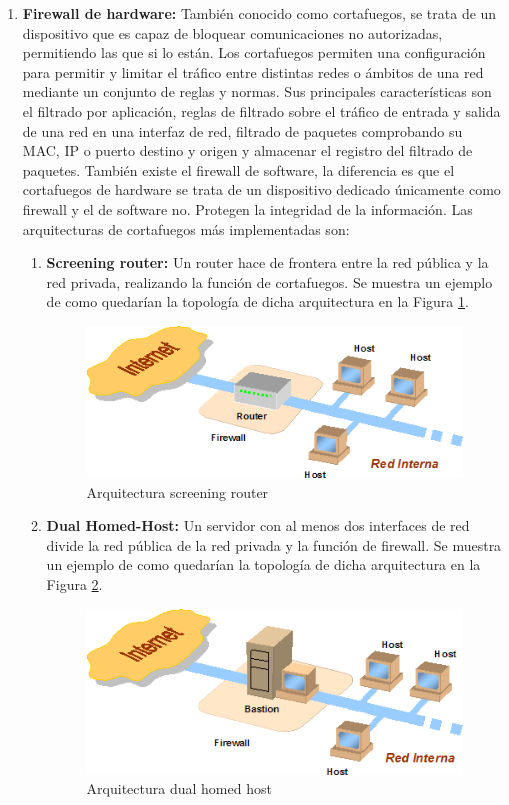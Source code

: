 \begin{enumerate}
\item {\bfseries Firewall de hardware:}
También conocido como cortafuegos, se trata de un dispositivo que es capaz de bloquear comunicaciones no autorizadas, permitiendo las que si lo están. Los cortafuegos permiten una configuración para permitir y limitar el tráfico entre distintas redes o ámbitos de una red mediante un conjunto de reglas y normas. Sus principales características son el filtrado por aplicación, reglas de filtrado sobre el tráfico de entrada y salida de una red en una interfaz de red, filtrado de paquetes comprobando su MAC, IP o puerto destino y origen y almacenar el registro del filtrado de paquetes. También existe el firewall de software, la diferencia es que el cortafuegos de hardware se trata de un dispositivo dedicado únicamente como firewall y el de software no. Protegen la integridad de la información.  Las arquitecturas de cortafuegos más implementadas son:
\begin{enumerate}
\item {\bfseries Screening router:}
 Un router hace de frontera entre la red pública y la red privada, realizando la función de cortafuegos. Se muestra un ejemplo de como quedarían la topología de dicha arquitectura en la Figura \ref{img:screening-router}.
\begin{figure}[H]
  		   \centering
     		   \includegraphics[width=5in]{screening-router.png}
  		   \caption{Arquitectura screening router \cite{firewall}}
  		   \label{img:screening-router}
\end{figure}

\item {\bfseries Dual Homed-Host:}
Un servidor con al menos dos interfaces de red divide la red pública de la red privada y la función de firewall. Se muestra un ejemplo de como quedarían la topología de dicha arquitectura en la Figura \ref{img:dual-homed-host}.
\begin{figure}[H]
  		   \centering
     		   \includegraphics[width=5in]{dual-homed-host.png}
  		   \caption{Arquitectura dual homed host \cite{firewall}}
  		   \label{img:dual-homed-host}
\end{figure}


\end{enumerate}
\end{enumerate}
